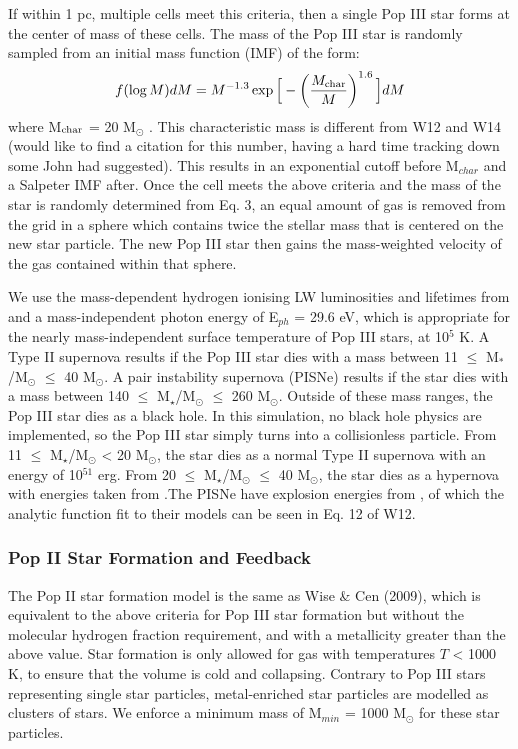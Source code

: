\documentclass[a4paper,fleqn,usenatbib]{mnras}
\begin{document}
If within 1 pc, multiple cells meet this criteria, then a single Pop III star forms at the center of mass of these cells. The mass of the Pop III star is randomly sampled from an initial mass function (IMF) of the form:
\begin{equation} \label{IMF}
	f(\log M)dM = M^{-1.3} \exp \Big[-\left( \frac{M_{\rm char}}{M}\right)^{1.6} \Big]dM
\end{equation}
where M$_{\rm char}$ = 20 M$_{\odot}$ \citep{Hirano17}. This characteristic mass is different from W12 and W14 (would like to find a citation for this number, having a hard time tracking down some John had suggested). This results in an exponential cutoff before M$_{char}$ and a Salpeter IMF after. Once the cell meets the above criteria and the mass of the star is randomly determined from Eq. 3, an equal amount of gas is removed from the grid in a sphere which contains twice the stellar mass that is centered on the new star particle. The new Pop III star then gains the mass-weighted velocity of the gas contained within that sphere.  

We use the mass-dependent hydrogen ionising LW luminosities and lifetimes from \citet{Schaerer02} and a mass-independent photon energy of E$_{ph}$ = 29.6 eV, which is appropriate for the nearly mass-independent surface temperature of Pop III stars, at 10$^{5}$ K. A Type II supernova results if the Pop III star dies with a mass between 11 $\leq$ M$_{\ast}$/M$_{\odot}$ $\leq$ 40 M$_{\odot}$. A pair instability supernova (PISNe) results if the star dies with a mass between 140 $\leq$ M$_{\star}$/M$_{\odot}$ $\leq$ 260 M$_{\odot}$. Outside of these mass ranges, the Pop III star dies as a black hole. In this simulation, no black hole physics are implemented, so the Pop III star simply turns into a collisionless particle. From 11 $\leq$ M$_{\star}$/M$_{\odot}$ < 20 M$_{\odot}$, the star dies as a normal Type II supernova with an energy of 10$^{51}$ erg. From 20 $\leq$ M$_{\star}$/M$_{\odot}$ $\leq$ 40 M$_{\odot}$, the star dies as a hypernova with energies taken from \citet{Nomoto06}.The PISNe have explosion energies from \citet{2002ApJ...567..532H}, of which the analytic function fit to their models can be seen in Eq. 12 of W12. 

\subsubsection{Pop II  Star Formation and Feedback}
The Pop II star formation model is the same as Wise \& Cen (2009), which is equivalent to the above criteria for Pop III star formation but without the molecular hydrogen fraction requirement, and with a metallicity greater than the above value. Star formation is only allowed for gas with temperatures $T$ < 1000 K, to ensure that the volume is cold and collapsing. Contrary to Pop III stars representing single star particles, metal-enriched star particles are modelled as clusters of stars. We enforce a minimum mass of M$_{min}$ = 1000 M$_{\odot}$ for these star particles. 
\end{document}
